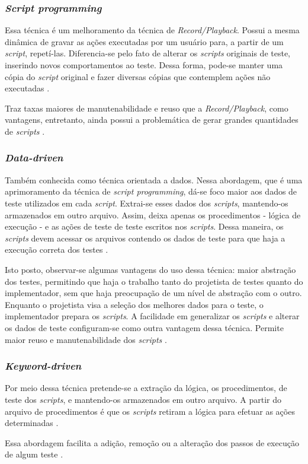 \subsubsection{\textit{Script programming}}
Essa técnica é um melhoramento da técnica de \textit{Record/Playback}. Possui a mesma dinâmica de gravar as ações executadas por um usuário para, a partir de um \textit{script}, repetí-las. Diferencia-se pelo fato de alterar os \textit{scripts} originais de teste, inserindo novos comportamentos ao teste. Dessa forma, pode-se manter uma cópia do \textit{script} original e fazer diversas cópias que contemplem ações não executadas \cite{kent2007}.
\par
\indent Traz taxas maiores de manutenabilidade e reuso que a \textit{Record/Playback}, como vantagens, entretanto, ainda possui a problemática de gerar grandes quantidades de \textit{scripts} \cite{fantinatoEtAl2004}.
\subsubsection{\textit{Data-driven}}
Também conhecida como técnica orientada a dados. Nessa abordagem, que é uma aprimoramento da técnica de \textit{script programming}, dá-se foco maior aos dados de teste utilizados em cada \textit{script}. Extrai-se esses dados dos \textit{scripts}, mantendo-os armazenados em outro arquivo. Assim, deixa apenas os procedimentos - lógica de execução - e as ações de teste de teste escritos nos \textit{scripts}. Dessa maneira, os \textit{scripts} devem acessar os arquivos contendo os dados de teste para que haja a execução correta dos testes \cite{kent2007}.
\par
\indent Isto posto, observar-se algumas vantagens do uso dessa técnica: maior abstração dos testes, permitindo que haja o trabalho tanto do projetista de testes quanto do implementador, sem que haja preocupação de um nível de abstração com o outro. Enquanto o projetista visa a seleção dos melhores dados para o teste, o implementador prepara os \textit{scripts}. A facilidade em generalizar os \textit{scripts} e alterar os dados de teste configuram-se como outra vantagem dessa técnica. Permite maior reuso e manutenabilidade dos \textit{scripts} \cite{fantinatoEtAl2004}.
\subsubsection{\textit{Keyword-driven}}
Por meio dessa técnica pretende-se a extração da lógica, os procedimentos, de teste dos \textit{scripts}, e mantendo-os armazenados em outro arquivo. A partir do arquivo de procedimentos é que os \textit{scripts} retiram a lógica para efetuar as ações determinadas \cite{kent2007}.
\par
\indent Essa abordagem facilita a adição, remoção ou a alteração dos passos de execução de algum teste \cite{fantinatoEtAl2004}.











